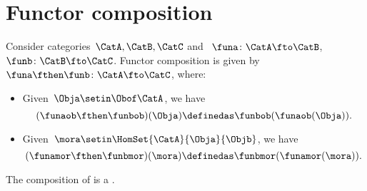 
\section{Functor composition}
\begin{ctdefinition}
    \label{def:functor-composition}
    Consider categories~$\CatA,\CatB,\CatC$ and ~$\funa\colon \CatA\fto \CatB$,~$\funb \colon \CatB\fto \CatC$.
    Functor composition is given by~$\funa\fthen \funb\colon \CatA \fto \CatC$, where:
    \begin{itemize}
        \item Given~$\Obja\setin \Obof\CatA$, we have
              \begin{equation}
                  (\funaob\fthen \funbob)(\Obja)
                  \definedas\funbob(\funaob(\Obja)).
              \end{equation}
        \item Given~$\mora \setin \HomSet{\CatA}{\Obja}{\Objb}$, we have
              \begin{equation}
                  (\funamor\fthen \funbmor)(\mora)
                  \definedas \funbmor(\funamor(\mora)).
              \end{equation}
    \end{itemize}
\end{ctdefinition}

\begin{lemma}
    \label{lem:functors_compose}
    The composition of  is a .
\end{lemma}

